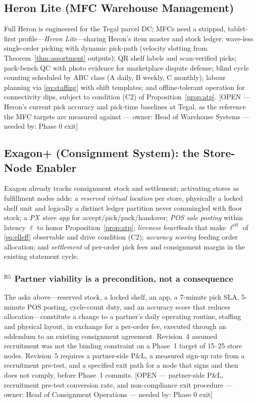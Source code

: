 \documentclass[10pt,twocolumn,letterpaper]{article}
\theoremstyle{definition}
\newcommand{\OPEN}[3]{{\color{openred}\footnotesize\textsf{[OPEN --- #1 --- owner: #2 --- needed by: #3]}}}
\begin{document}
\subsection{Heron Lite (MFC Warehouse Management)}
Full Heron is engineered for the Tegal parcel DC; MFCs need a stripped, tablet-first profile---\emph{Heron Lite}---sharing Heron's item master and stock ledger: wave-less single-order picking with dynamic pick-path (velocity slotting from Theorem~\ref{thm:assortment} outputs); QR shelf labels and scan-verified picks; pack-bench QC with photo evidence for marketplace dispute defense; blind cycle counting scheduled by ABC class (A daily, B weekly, C monthly); labour planning via \eqref{eq:staffing} with shift templates; and offline-tolerant operation for connectivity dips, subject to condition (C2) of Proposition~\ref{prop:atp}. \OPEN{Heron's current pick accuracy and pick-time baselines at Tegal, as the reference the MFC targets are measured against}{Head of Warehouse Systems}{Phase 0 exit}

\subsection{Exagon+ (Consignment System): the Store-Node Enabler}
Exagon already tracks consignment stock and settlement; activating stores as fulfillment nodes adds: a \emph{reserved virtual location} per store, physically a locked shelf unit and logically a distinct ledger partition never commingled with floor stock; a \emph{PX store app} for accept/pick/pack/handover; \emph{POS sale posting} within latency $\ell$ to honor Proposition~\ref{prop:atp}; \emph{liveness heartbeats} that make $\ell^{\mathrm{eff}}$ of \eqref{eq:elleff} observable and drive condition (C2); \emph{accuracy scoring} feeding order allocation; and \emph{settlement} of per-order pick fees and consignment margin in the existing statement cycle.

\subsubsection*{$^{\mathrm{R5}}$ Partner viability is a precondition, not a consequence}
The asks above---reserved stock, a locked shelf, an app, a 7-minute pick SLA, 5-minute POS posting, cycle-count duty, and an accuracy score that reduces allocation---constitute a change to a partner's daily operating routine, staffing and physical layout, in exchange for a per-order fee, executed through an addendum to an existing consignment agreement. Revision~4 assumed recruitment was not the binding constraint on a Phase~1 target of 15--25 store nodes. Revision~5 requires a partner-side P\&L, a measured sign-up rate from a recruitment pre-test, and a specified exit path for a node that signs and then does not comply, before Phase~1 commits. \OPEN{partner-side P\&L, recruitment pre-test conversion rate, and non-compliance exit procedure}{Head of Consignment Operations}{Phase 0 exit}
\end{document}
